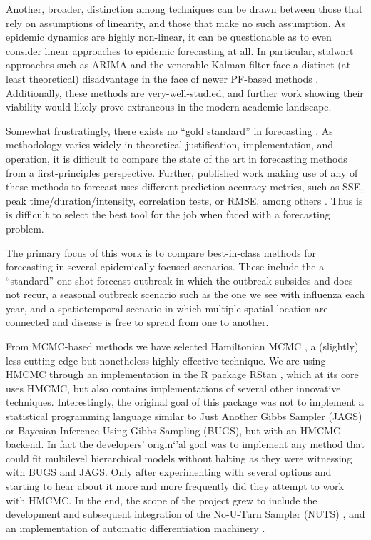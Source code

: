 Another, broader, distinction among techniques can be drawn between those that rely on assumptions of linearity, and those that make no such assumption. As epidemic dynamics are highly non-linear, it can be questionable as to even consider linear approaches to epidemic forecasting at all. In particular, stalwart approaches such as ARIMA and the venerable Kalman filter face a distinct (at least theoretical) disadvantage in the face of newer PF-based methods \cite{Yang2014}\cite{Sugihara1994}. Additionally, these methods are very-well-studied, and further work showing their viability would likely prove extraneous in the modern academic landscape.

Somewhat frustratingly, there exists no ``gold standard'' in forecasting \cite{Nsoesie2014}\cite{Yang2014}\cite{Chretien2014}. As methodology varies widely in theoretical justification, implementation, and operation, it is difficult to compare the state of the art in forecasting methods from a first-principles perspective. Further, published work making use of any of these methods to forecast uses different prediction accuracy metrics, such as SSE, peak time/duration/intensity, correlation tests, or RMSE, among others \cite{Nsoesie2013}\cite{Chretien2014}. Thus is is difficult to select the best tool for the job when faced with a forecasting problem.

The primary focus of this work is to compare best-in-class methods for forecasting in several epidemically-focused scenarios. These include the a ``standard'' one-shot forecast outbreak in which the outbreak subsides and does not recur, a seasonal outbreak scenario such as the one we see with influenza each year, and a spatiotemporal scenario in which multiple spatial location are connected and disease is free to spread from one to another.

From MCMC-based methods we have selected Hamiltonian MCMC \cite{Neal2011}, a (slightly) less cutting-edge but nonetheless highly effective technique. We are using HMCMC through an implementation in the R package RStan \cite{Carpenter2016}, which at its core uses HMCMC, but also contains implementations of several other innovative techniques. Interestingly, the original goal of this package was not to implement a statistical programming language similar to Just Another Gibbs Sampler (JAGS) or Bayesian Inference Using Gibbs Sampling (BUGS), but with an HMCMC backend. In fact the developers' origin`'al goal was to implement any method that could fit multilevel hierarchical models without halting as they were witnessing with BUGS and JAGS. Only after experimenting with several options and starting to hear about it more and more frequently did they attempt to work with HMCMC. In the end, the scope of the project grew to include the development and subsequent integration of the No-U-Turn Sampler (NUTS) \cite{Hoffman2014}, and an implementation of automatic differentiation machinery \cite{StanDevelopmentTeam2015}.

